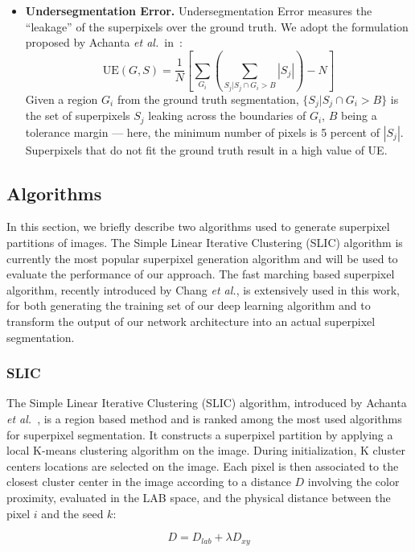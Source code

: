 \documentclass{article}
\begin{document}
\begin{itemize}
            \item \textbf{Undersegmentation Error.} Undersegmentation Error measures the ``leakage'' of the superpixels over the ground truth. We adopt the formulation proposed by Achanta \textit{et al.}~in~\cite{achanta2012}:
            $$
            \mathrm{UE}(G,S)=\frac{1}{N} \left[\sum_{G_i} \left(\sum_{S_j | S_j \cap G_i>B}|S_j|\right)-N\right]
            $$
            Given a region $G_i$ from the ground truth segmentation, $\{S_j | S_j \cap G_i>B\}$ is the set of superpixels $S_j$ leaking across the boundaries of $G_i$, $B$ being a tolerance margin --- here, the minimum number of pixels is 5 percent of $|S_j|$. Superpixels that do not fit the ground truth result in a high value of UE.
        \end{itemize}

    \subsection{Algorithms}
        In this section, we briefly describe two algorithms used to generate superpixel partitions of images.  The Simple Linear Iterative Clustering (SLIC) algorithm is currently the most popular superpixel generation algorithm and will be used to evaluate the performance of our approach. The fast marching based superpixel algorithm, recently introduced by Chang \textit{et al.}\cite{figliuzzi2019}, is extensively used in this work, for both generating the training set of our deep learning algorithm and to transform the output of our network architecture into an actual superpixel segmentation.

        \subsubsection{SLIC}
            The Simple Linear Iterative Clustering (SLIC) algorithm, introduced by Achanta \textit{et al.}~\cite{achanta2012,achanta2017}, is a region based method and is ranked among the most used algorithms for superpixel segmentation. It constructs a superpixel partition by applying a local K-means clustering algorithm on the image. During initialization, K cluster centers locations are selected on the image. Each pixel is then associated to the closest cluster center in the image according to a distance $D$ involving the color proximity, evaluated in the LAB space, and the physical distance between the pixel $i$ and the seed $k$:

            $$
            D = D_{lab} + \lambda D_{xy}
            $$
\end{document}
